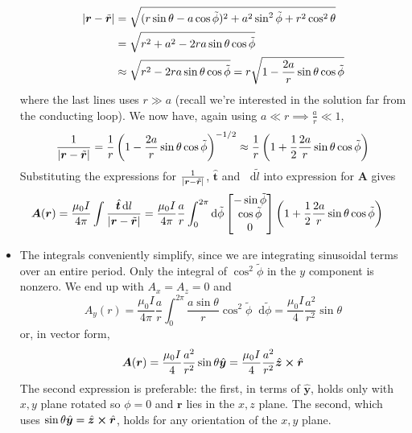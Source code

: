 \documentclass[11pt, a4paper]{article}
\newcommand{\diff}{\mathop{}\!\mathrm{d}} %
\renewcommand{\vec}[1]{\bm{#1}} %
\newcommand{\uvec}[1]{\hat{\vec{#1}}} %
\newcommand{\tvec}[1]{\tilde{\vec{#1}}} %
\renewcommand{\r}{\vec{r}}
\newcommand{\A}{\vec{A}} %
\begin{document}
\begin{itemize}
	\begin{align*}
		\abs{\r - \tvec{r}} &= \sqrt{(r \sin \theta - a \cos \tilde{\phi} )^{2} + a^{2}\sin^{2}\tilde{\phi} + r^{2}\cos^{2} \theta}\\
		& = \sqrt{r^{2} + a^{2} - 2ra \sin \theta \cos \tilde \phi}\\
		&\approx \sqrt{r^{2} - 2ra \sin \theta \cos \tilde \phi} = r \sqrt{1 - \frac{2a}{r}\sin \theta \cos \tilde{\phi}}
	\end{align*}
	where the last lines uses $ r \gg a $ (recall we're interested in the solution far from the conducting loop). We now have, again using $ a \ll r \implies \frac{a}{r} \ll 1 $,
	\begin{equation*}
		\frac{1}{\abs{\r - \tvec{r}}} = \frac{1}{r} \left(1 - \frac{2a}{r}\sin \theta \cos \tilde{\phi}\right)^{-1/2} \approx \frac{1}{r}\left(1 + \frac{1}{2}  \frac{2a}{r}\sin \theta \cos \tilde{\phi}\right)
	\end{equation*}
	Substituting the expressions for $ \frac{1}{\abs{\r - \tvec{r}}} $, $ \uvec{t} $ and $ \diff \tilde{l} $ into expression for $ \A $ gives
	\begin{align*}
		\A(\r) &= \frac{\mu_{0}I}{4\pi} \int \frac{\uvec{t} \diff l}{\abs{\r - \tvec{r}}} = \frac{\mu_{0}I}{4\pi} \frac{a}{r} \int_{0}^{2\pi} \diff \tilde{\phi}  
		\begin{bmatrix}
			- \sin \tilde{\phi}\\
			\cos \tilde{\phi}\\
			0
		\end{bmatrix}
		\left(1 + \frac{1}{2}  \frac{2a}{r}\sin \theta \cos \tilde{\phi}\right)
	\end{align*}
	
	\item The integrals conveniently simplify, since we are integrating sinusoidal terms over an entire period. Only the integral of $ \cos^{2} \tilde{\phi} $ in the $ y $ component is nonzero. We end up with $ A_{x} = A_{z} = 0 $ and
	\begin{equation*}
		A_{y}(r) = \frac{\mu_{0}I}{4\pi} \frac{a}{r} \int_{0}^{2\pi}
		 \frac{a\sin \theta}{r} \cos^{2} \tilde{\phi} \diff \tilde{\phi} = \frac{\mu_{0}I}{4} \frac{a^{2}}{r^{2}}  \sin \theta 
	\end{equation*}
	or, in vector form,
	\begin{equation*}
		\A(\r) = \frac{\mu_{0}I}{4} \frac{a^{2}}{r^{2}}  \sin \theta \uvec{y} = \frac{\mu_{0}I}{4} \frac{a^{2}}{r^{2}} \uvec{z} \cross \uvec{r}
	\end{equation*}
	The second expression is preferable: the first, in terms of $ \uvec{y} $, holds only with $ x, y $ plane rotated so $ \phi = 0 $ and $ \r $ lies in the $ x, z $ plane. The second, which uses $ \sin \theta \uvec{y} = \uvec{z} \cross \uvec{r} $, holds for any orientation of the $ x, y $ plane. 
	

\end{itemize}
\end{document}
